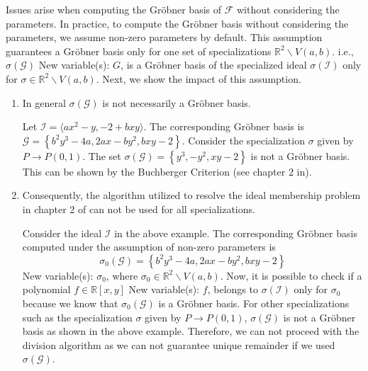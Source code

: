 \documentclass[runningheads]{llncs}
\newcommand{\1}{\chi}
\begin{document}
Issues arise when computing the Gr{\"o}bner basis of \(\mathcal{F}\) without considering the parameters.
In practice, to compute the Gr{\"o}bner basis without considering the parameters, we assume non-zero parameters by default.
This assumption guarantees a Gr{\"o}bner basis only for one set of specializations \(\mathbb{R}^2\backslash V(a,b)\). i.e., 
\(\sigma(\mathcal{G})\)
{\color{blue} New variable(s): \(G\),  }
 is a Gr{\"o}bner basis of the specialized ideal \(\sigma(\mathcal{I})\) only for \(\sigma \in \mathbb{R}^2\backslash V(a,b)\).
Next, we show the impact of this assumption.
\begin{enumerate}
    \item In general \(\sigma\left(\mathcal{G}\right)\) is not necessarily a Gr{\"o}bner basis.
    \begin{example}
        \label{ex431}
        Let \(\mathcal{I}=\langle 
           {a x^2 - y, -2 + b x y} \rangle\). The corresponding Gr{\"o}bner basis 
           is \(\mathcal{G}=\left\{b^2 y^3-4 a,2 a x-b y^2,b x y-2\right\}\). Consider 
           the specialization \(\sigma\) given by \(P\rightarrow P(0,1)\).
           The set \(\sigma(\mathcal{G})=\left\{y^3,-y^2,x y-2\right\}\) is not a Gr{\"o}bner basis.
		   This can be shown by the Buchberger Criterion (see chapter 2 in\cite{Cox}).

    \end{example}
    \item Consequently, the algorithm utilized to resolve the ideal membership 
    problem in chapter 2 of \cite{Cox} can not be used for all specializations. 
    
    \begin{example}
        \label{ex433}
        Consider the ideal \(\mathcal{I}\) in the above example. The corresponding Gr{\"o}bner basis computed under the assumption of non-zero parameters
        is \[\sigma_0(\mathcal{G})=\left\{b^2 y^3-4 a,2 a x-b y^2,b x y-2\right\}\]
{\color{blue} New variable(s): \(\sigma _0\),  }
 where \(\sigma_0 \in \mathbb{R}^2\backslash V(a,b)\). 
        Now, it is possible to check if a polynomial \(f\in \mathbb{R}[x,y]\)
{\color{blue} New variable(s): \(f\),  }
 belongs to \(\sigma(\mathcal{I})\) only for \(\sigma_0 \)     
        because we know that \(\sigma_0(\mathcal{G})\) is a Gr{\"o}bner basis. For other specializations such as 
        the specialization \(\sigma\) given by \(P\rightarrow P(0,1)\), \(\sigma(\mathcal{G})\) is not a Gr{\"o}bner basis as shown in the above example. 
        Therefore, we can not proceed with the division algorithm as we can not guarantee unique remainder if we used \(\sigma(\mathcal{G})\).  
    \end{example}


\end{enumerate}
\end{document}
